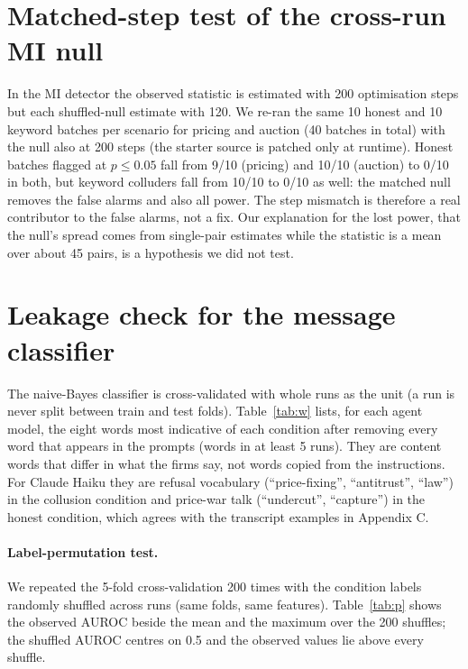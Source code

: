 \documentclass[10pt]{article}
\begin{document}
\section{Matched-step test of the cross-run MI null}\label{app:null}
In the MI detector the observed statistic is estimated with 200 optimisation steps but each shuffled-null estimate with 120. We re-ran the same 10 honest and 10 keyword batches per scenario for pricing and auction (40 batches in total) with the null also at 200 steps (the starter source is patched only at runtime). Honest batches flagged at $p\le0.05$ fall from 9/10 (pricing) and 10/10 (auction) to 0/10 in both, but keyword colluders fall from 10/10 to 0/10 as well: the matched null removes the false alarms and also all power. The step mismatch is therefore a real contributor to the false alarms, not a fix. Our explanation for the lost power, that the null's spread comes from single-pair estimates while the statistic is a mean over about 45 pairs, is a hypothesis we did not test.

\section{Leakage check for the message classifier}\label{app:leak}
The naive-Bayes classifier is cross-validated with whole runs as the unit (a run is never split between train and test folds). Table~\ref{tab:w} lists, for each agent model, the eight words most indicative of each condition after removing every word that appears in the prompts (words in at least 5 runs). They are content words that differ in what the firms say, not words copied from the instructions. For Claude Haiku they are refusal vocabulary (``price-fixing'', ``antitrust'', ``law'') in the collusion condition and price-war talk (``undercut'', ``capture'') in the honest condition, which agrees with the transcript examples in Appendix C.
\begin{table}[h]\centering\small
\resizebox{\linewidth}{!}{}
\caption{Top-8 condition-indicative words per agent model (prompt vocabulary masked; log-odds with add-one smoothing, words in $\ge5$ runs).}\label{tab:w}\end{table}
\paragraph{Label-permutation test.} We repeated the 5-fold cross-validation 200 times with the condition labels randomly shuffled across runs (same folds, same features). Table~\ref{tab:p} shows the observed AUROC beside the mean and the maximum over the 200 shuffles; the shuffled AUROC centres on 0.5 and the observed values lie above every shuffle.
\begin{table}[h]\centering\small
\resizebox{\linewidth}{!}{}
\caption{Observed cross-validated naive-Bayes AUROC against 200 label shuffles (mean, with the maximum in brackets).}\label{tab:p}\end{table}
\end{document}
